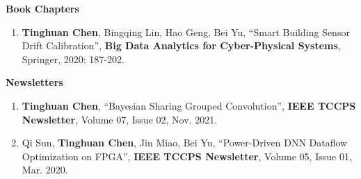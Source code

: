 \documentclass[letterpaper,11pt]{article}%
\newlength{\outerbordwidth}
\newcommand{\resheading}[1]{\vspace{8pt}
  \parbox{\textwidth}{\setlength{\FrameSep}{\outerbordwidth}
    \begin{shaded}

\setlength{\fboxsep}{0pt}\framebox[\textwidth][l]{\setlength{\fboxsep}{4pt}\fcolorbox{shadecolorB}{shadecolorB}{\textbf{\sffamily{\mbox{~}\makebox[6.762in][l]{\large #1} \vphantom{p\^{E}}}}}}
    \end{shaded}
  }\vspace{-5pt}
}
\begin{document}
\textbf{Book Chapters}

\begin{enumerate}[(1)]


\item \textbf{Tinghuan Chen}, Bingqing Lin, Hao Geng, Bei Yu, ``Smart Building Sensor Drift Calibration'', \textbf{Big Data Analytics for Cyber-Physical Systems}, Springer, 2020: 187-202.

\end{enumerate}

\textbf{Newsletters}

\begin{enumerate}[(1)]

\item \textbf{Tinghuan Chen}, ``Bayesian Sharing Grouped Convolution'', \textbf{IEEE TCCPS Newsletter}, Volume 07, Issue 02, Nov. 2021.

\item Qi Sun, \textbf{Tinghuan Chen}, Jin Miao, Bei Yu, ``Power-Driven DNN Dataflow Optimization on FPGA'', \textbf{IEEE TCCPS Newsletter}, Volume 05, Issue 01, Mar. 2020.

\end{enumerate}


%
%
%
%
%
%






\end{document}
